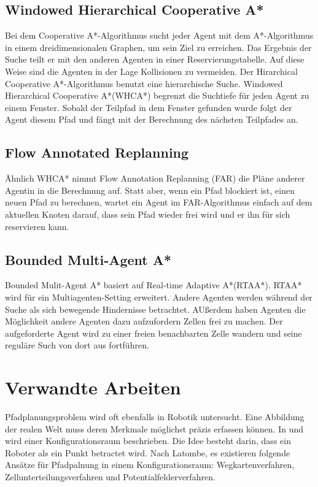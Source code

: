 \subsection{Windowed Hierarchical Cooperative A*}
Bei dem Cooperative A*-Algorithmus sucht jeder Agent mit dem A*-Algorithmus in einem dreidimensionalen Graphen, um sein Ziel zu erreichen. Das Ergebnis der Suche teilt er mit den anderen Agenten in einer Reservierungstabelle. Auf diese Weise sind die Agenten in der Lage Kollisionen zu vermeiden. Der Hirarchical Cooperative A*-Algorithmus benutzt eine hierarchische Suche. Windowed Hierarchical Cooperative A*(WHCA*) begrenzt die Suchtiefe für jeden Agent zu einem Fenster. Sobald der Teilpfad in dem Fenster gefunden wurde folgt der Agent diesem Pfad und fängt mit der Berechnung des nächsten Teilpfades an. 
\subsection{Flow Annotated Replanning}
Ähnlich WHCA* nimmt Flow Annotation Replanning (FAR) die Pläne anderer Agentin in die Berechnung auf. Statt aber, wenn ein Pfad blockiert ist, einen neuen Pfad zu berechnen, wartet ein Agent im FAR-Algorithmus einfach auf dem aktuellen Knoten darauf, dass sein Pfad wieder frei wird und er ihn für sich reservieren kann. 

\subsection{Bounded Multi-Agent A*}
Bounded Mulit-Agent A* basiert auf Real-time Adaptive A*(RTAA*). RTAA* wird für ein Multiagenten-Setting erweitert. Andere Agenten werden während der Suche als sich bewegende Hindernisse betrachtet. AUßerdem haben Agenten die Möglichkeit andere Agenten dazu aufzufordern Zellen frei zu machen. Der aufgeforderte Agent wird zu einer freien benachbarten Zelle wandern und seine reguläre Such von dort aus fortführen\cite{Sigurdson.2019}.


\section{Verwandte Arbeiten} 
Pfadplanungsproblem wird oft ebenfalls in Robotik untersucht. Eine Abbildung der realen Welt muss deren Merkmale möglichst präzis erfassen können. In \cite{lozano} und \cite{latombe} wird einer Konfigurationsraum beschrieben. Die Idee besteht darin, dass ein Roboter als ein Punkt betractet wird. Nach Latombe\cite{latombe}, es existieren folgende Ansätze für Pfadpalnung in einem Konfigurationsraum: Wegkartenverfahren, Zellunterteilungsverfahren und Potentialfelderverfahren. 


